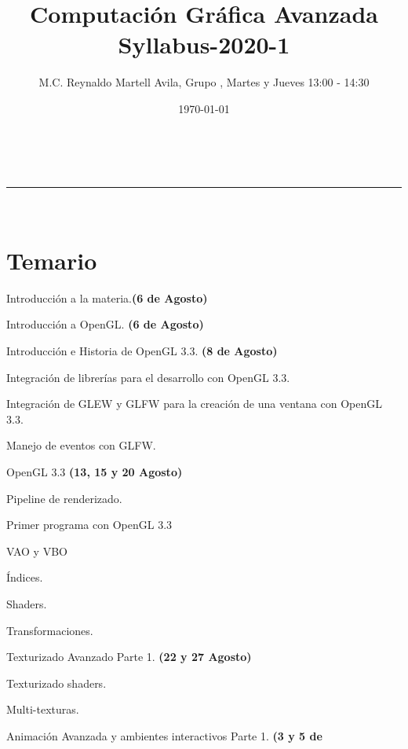 \documentclass[a4paper,11pt]{article}
\makeatletter
\newcommand{\linia}{\rule{\linewidth}{0.5pt}}
\theoremstyle{mytheor}
\renewcommand{\maketitle}{
\begin{center}
\vspace{2ex}
{\huge \textsc{\@title}}
\vspace{1ex}
\\
\linia\\
\@author \hfill \@date
\vspace{4ex}
\end{center}
}
\makeatother
\begin{document}
\title{Computación Gráfica Avanzada \\ Syllabus-2020-1}

\author{M.C. Reynaldo Martell Avila, Grupo  , Martes y Jueves 13:00 - 14:30}

\date{\today}

\maketitle

\section*{Temario}

Introducción a la materia.\textbf{(6 de Agosto)}
\begin{legal}
	\item Introducción a OpenGL. \textbf{(6 de Agosto)}
	\begin{legal}
		\item Introducción e Historia de OpenGL 3.3. \textbf{(8 de Agosto)}
		\item Integración de librerías para el desarrollo con OpenGL 3.3.
		\begin{legal}
			\item Integración de GLEW y GLFW para la creación de una ventana con
OpenGL 3.3.
			\item Manejo de eventos con GLFW.
		\end{legal}
	\end{legal}
	\item OpenGL 3.3 \textbf{(13, 15 y 20 Agosto)}
	\begin{legal}
		\item Pipeline de renderizado.
		\item Primer programa con OpenGL 3.3
		\item VAO y VBO
		\item Índices.
		\item Shaders.
		\item Transformaciones.
	\end{legal}
	\item Texturizado Avanzado Parte 1. \textbf{(22 y 27 Agosto)}
	\begin{legal}
		\item Texturizado shaders.
		\item Multi-texturas.
	\end{legal}
	\item Animación Avanzada y ambientes interactivos Parte 1. \textbf{(3 y 5 de
}
\end{legal}
\end{document}
